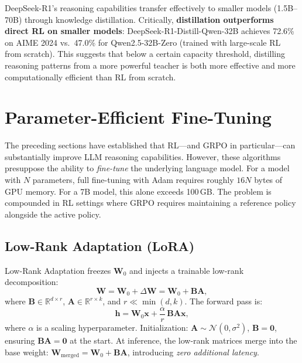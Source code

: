 \documentclass[12pt,a4paper]{report}
\begin{document}
DeepSeek-R1's reasoning capabilities transfer effectively to smaller models (1.5B--70B) through knowledge distillation. Critically, \textbf{distillation outperforms direct RL on smaller models}: DeepSeek-R1-Distill-Qwen-32B achieves 72.6\% on AIME 2024 vs.\ 47.0\% for Qwen2.5-32B-Zero (trained with large-scale RL from scratch). This suggests that below a certain capacity threshold, distilling reasoning patterns from a more powerful teacher is both more effective and more computationally efficient than RL from scratch.


\section{Parameter-Efficient Fine-Tuning}
\label{sec:peft}

The preceding sections have established that RL---and GRPO in particular---can substantially improve LLM reasoning capabilities. However, these algorithms presuppose the ability to \emph{fine-tune} the underlying language model. For a model with $N$ parameters, full fine-tuning with Adam requires roughly $16N$ bytes of GPU memory. For a 7B model, this alone exceeds 100\,GB. The problem is compounded in RL settings where GRPO requires maintaining a reference policy alongside the active policy.

\subsection{Low-Rank Adaptation (LoRA)}
\label{sec:lora}

Low-Rank Adaptation \citep{hu2021lora} freezes $\mathbf{W}_0$ and injects a trainable low-rank decomposition:
\begin{equation}
  \label{eq:lora-weight}
  \mathbf{W} = \mathbf{W}_0 + \Delta\mathbf{W}
             = \mathbf{W}_0 + \mathbf{B}\mathbf{A},
\end{equation}
where $\mathbf{B} \in \mathbb{R}^{d \times r}$, $\mathbf{A} \in \mathbb{R}^{r \times k}$, and $r \ll \min(d, k)$. The forward pass is:
\begin{equation}
  \mathbf{h} = \mathbf{W}_0 \mathbf{x}
               + \frac{\alpha}{r}\,\mathbf{B}\mathbf{A}\mathbf{x},
\end{equation}
where $\alpha$ is a scaling hyperparameter. Initialization: $\mathbf{A} \sim \mathcal{N}(0, \sigma^2)$, $\mathbf{B} = \mathbf{0}$, ensuring $\mathbf{B}\mathbf{A} = \mathbf{0}$ at the start. At inference, the low-rank matrices merge into the base weight: $\mathbf{W}_{\text{merged}} = \mathbf{W}_0 + \mathbf{B}\mathbf{A}$, introducing \emph{zero additional latency}.
\end{document}
